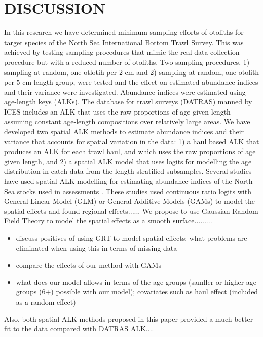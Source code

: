 \documentclass[a4paper 12pt]{article}
\numberwithin{equation}{section}
\begin{document}
\clearpage

\section{DISCUSSION}
\label{sec:discussion}

In this research we have determined minimum sampling efforts of otoliths for target species of the North Sea International Bottom Trawl Survey. This was achieved by testing sampling procedures that mimic the real data collection procedure but with a reduced number of otoliths. Two sampling procedures, 1) sampling at random, one otlotih per $2$ cm and 2) sampling at random, one otolith per $5$ cm length group, were tested and the effect on estimated abundance indices and their variance were investigated. Abundance indices were estimated using age-length keys (ALKs). The database for trawl surveys (DATRAS) manned by ICES includes an ALK that uses the raw proportions of age given length assuming constant age-length compositions over relatively large areas. We have developed two spatial ALK methods  to estimate abundance indices and their variance that accounts for spatial variation in the data: 1) a haul based ALK that produces an ALK for each trawl haul, and which uses the raw proportions of age given length, and 2) a spatial ALK model that uses logits for modelling the age distribution in catch data from the length-stratified  subsamples. Several studies have used spatial ALK modelling for estimating abundance indices of the North Sea stocks used in  assessments \citep{berg2012spatial, berg2014evaluation, gerritsen2006simple}. These studies used continuous ratio logits with General Linear Model (GLM) or General Additive Models (GAMs) to model the spatial effects and found regional effects...... We propose to use Gaussian Random Field Theory to model the spatial effects as a smooth surface.........
\begin{itemize}
\item discuss positives of using GRT to model spatial effects: what problems are eliminated when using this in terms of missing data
\item compare the effects of our method with GAMs \citep{berg2012spatial}
\item what does our model allows in terms of the age groups (samller or higher age groups (6+) possible with our model); covariates such as haul effect (included as a random effect)
\end{itemize}
Also, both spatial ALK methods proposed in this paper provided a much better fit to the data compared with DATRAS ALK....
\end{document}
